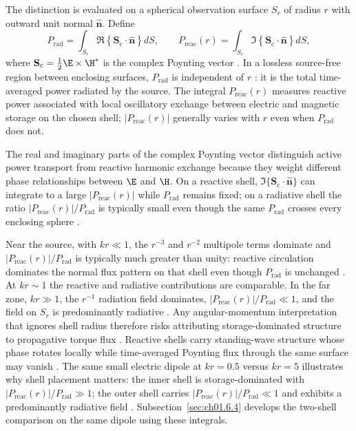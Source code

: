 The distinction is evaluated on a spherical observation surface $S_r$ of radius $r$ with outward unit normal $\hat{\mathbf{n}}$. Define
\begin{equation}
\label{eq:ch1.ex64-power-functionals}
P_{\mathrm{rad}}=\int_{S_r}\Re\!\left\{\mathbf{S}_\mathrm{c}\cdot\hat{\mathbf{n}}\right\}dS,\qquad
P_{\mathrm{reac}}(r)=\int_{S_r}\Im\!\left\{\mathbf{S}_\mathrm{c}\cdot\hat{\mathbf{n}}\right\}dS,
\end{equation}
where \(\mathbf{S}_\mathrm{c}=\tfrac{1}{2}\E\times\H^*\) is the complex Poynting vector
\cite{poynting1884}. In a lossless source-free region between enclosing surfaces, $P_{\mathrm{rad}}$ is independent of $r$ \cite{stratton1941}: it is the total time-averaged power radiated by the source. The integral $P_{\mathrm{reac}}(r)$ measures reactive power associated with local oscillatory exchange between electric and magnetic storage on the chosen shell; $|P_{\mathrm{reac}}(r)|$ generally varies with $r$ even when $P_{\mathrm{rad}}$ does not.

The real and imaginary parts of the complex Poynting vector distinguish active power transport from reactive harmonic exchange because they weight different phase relationships between \(\E\) and \(\H\). On a reactive shell, \(\Im\{\mathbf{S}_\mathrm{c}\cdot\hat{\mathbf{n}}\}\) can integrate to a large \(|P_{\mathrm{reac}}(r)|\) while \(P_{\mathrm{rad}}\) remains fixed; on a radiative shell the ratio \(|P_{\mathrm{reac}}(r)|/P_{\mathrm{rad}}\) is typically small even though the same $P_{\mathrm{rad}}$ crosses every enclosing sphere \cite{poynting1884,stratton1941}.

Near the source, with \(kr\ll 1\), the \(r^{-3}\) and \(r^{-2}\) multipole terms dominate and \(|P_{\mathrm{reac}}(r)|/P_{\mathrm{rad}}\) is typically much greater than unity: reactive circulation dominates the normal flux pattern on that shell even though \(P_{\mathrm{rad}}\) is unchanged \cite{stratton1941}. At \(kr\sim 1\) the reactive and radiative contributions are comparable. In the far zone, \(kr\gg 1\), the \(r^{-1}\) radiation field dominates, \(|P_{\mathrm{reac}}(r)|/P_{\mathrm{rad}}\ll 1\), and the field on \(S_r\) is predominantly radiative \cite{poynting1884,stratton1941}. Any angular-momentum interpretation that ignores shell radius therefore risks
attributing storage-dominated structure to propagative torque flux
\cite{stratton1941}. Reactive shells carry standing-wave structure whose phase rotates
locally while time-averaged Poynting flux through the same surface may vanish
\cite{stratton1941}. The same small electric dipole at $kr=0.5$ versus $kr=5$ illustrates why
shell placement matters: the inner shell is storage-dominated with \(|P_{\mathrm{reac}}(r)|/P_{\mathrm{rad}}\gg 1\); the outer shell carries \(|P_{\mathrm{reac}}(r)|/P_{\mathrm{rad}}\ll 1\) and exhibits a predominantly radiative field \cite{harrington2001}. Subsection~\ref{sec:ch01.6.4} develops the two-shell comparison on the same dipole using these integrals.

